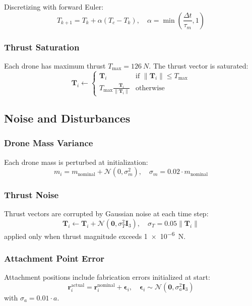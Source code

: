 \documentclass[12pt,a4paper]{article}
\begin{document}
Discretizing with forward Euler:
\begin{equation}
    T_{k+1} = T_k + \alpha(T_c - T_k), \quad \alpha = \min\left(\frac{\Delta t}{\tau_m}, 1\right)
    \label{eq:motor_discrete}
\end{equation}

\subsubsection{Thrust Saturation}
Each drone has maximum thrust $T_{\max} = \SI{126}{N}$. The thrust vector is saturated:
\begin{equation}
    \mathbf{T}_i \leftarrow \begin{cases}
        \mathbf{T}_i & \text{if } \|\mathbf{T}_i\| \leq T_{\max} \\
        T_{\max} \frac{\mathbf{T}_i}{\|\mathbf{T}_i\|} & \text{otherwise}
    \end{cases}
    \label{eq:thrust_saturation}
\end{equation}

\subsection{Noise and Disturbances}

\subsubsection{Drone Mass Variance}
Each drone mass is perturbed at initialization:
\begin{equation}
    m_i = m_{\text{nominal}} + \mathcal{N}(0, \sigma_m^2), \quad \sigma_m = 0.02 \cdot m_{\text{nominal}}
    \label{eq:mass_variance}
\end{equation}

\subsubsection{Thrust Noise}
Thrust vectors are corrupted by Gaussian noise at each time step:
\begin{equation}
    \mathbf{T}_i \leftarrow \mathbf{T}_i + \mathcal{N}(\mathbf{0}, \sigma_T^2\mathbf{I}_3), \quad \sigma_T = 0.05 \|\mathbf{T}_i\|
    \label{eq:thrust_noise}
\end{equation}
applied only when thrust magnitude exceeds \SI{1e-6}{N}.

\subsubsection{Attachment Point Error}
Attachment positions include fabrication errors initialized at start:
\begin{equation}
    \mathbf{r}_i^{\text{actual}} = \mathbf{r}_i^{\text{nominal}} + \boldsymbol{\epsilon}_i, \quad \boldsymbol{\epsilon}_i \sim \mathcal{N}(\mathbf{0}, \sigma_a^2\mathbf{I}_3)
    \label{eq:attachment_error}
\end{equation}
with $\sigma_a = 0.01 \cdot a$.
\end{document}
